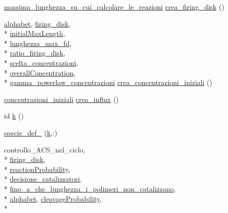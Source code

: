 \begin{DoxyCompactItemize}
\hyperlink{a00065_a4e714d8e6551275aafab501b8c9f18ad}{massima\-\_\-lunghezza\-\_\-su\-\_\-cui\-\_\-calcolare\-\_\-le\-\_\-reazioni} \hyperlink{a00062_a9436783422a447fac5122c24d195e61d}{crea\-\_\-firing\-\_\-disk} ()
\item 
\hyperlink{a00065_abcbc32fc68e4323620d6171a17310212}{alphabet}, \hyperlink{a00055_acb72987b5000cf59c6f81c482e2ac8ac}{firing\-\_\-disk}, \\*
\hyperlink{a00064_a4c7433c24b6426a15069cc5a93a5cbec}{initial\-Max\-Length}, \\*
\hyperlink{a00065_a7c974cc56015b6503e0619d32ebd4180}{lunghezza\-\_\-max\-\_\-fd}, \\*
\hyperlink{a00064_acd685f63a27f53fc049aff633634ddd6}{ratio\-\_\-firing\-\_\-disk}, \\*
\hyperlink{a00065_ac60b74a4c1b8bc23e64008ba1e0c41a8}{scelta\-\_\-concentrazioni}, \\*
\hyperlink{a00065_a59597688ed79473c0234f45eb9167574}{overall\-Concentration}, \\*
\hyperlink{a00065_a7cd0915d7542523abc226a8eecf67ecf}{gamma\-\_\-powerlaw\-\_\-concentrazioni} \hyperlink{a00062_a46820e2abe661887eb3c03ebcdd5aa14}{crea\-\_\-concentrazioni\-\_\-iniziali} ()
\item 
\hyperlink{a00055_a89801fa89eee3ba40f6610f290d6f6c3}{concentrazioni\-\_\-iniziali} \hyperlink{a00062_aedefd8a9b5b6248834cd58472da4be7d}{crea\-\_\-influx} ()
\item 
id \hyperlink{a00062_abf70355c2e58f64c6b18bda1b9bccfd7}{k} ()
\item 
\hyperlink{a00062_a206c02e53d19e1a7f6c297114dd5becb}{specie\-\_\-def\-\_} (\hyperlink{a00062_abf70355c2e58f64c6b18bda1b9bccfd7}{k},\-:)
\item 
controllo\-\_\-\-A\-C\-S\-\_\-nel\-\_\-ciclo, \\*
\hyperlink{a00055_acb72987b5000cf59c6f81c482e2ac8ac}{firing\-\_\-disk}, \\*
\hyperlink{a00065_a9101beaeb03fddb5c6a9e68442177543}{reaction\-Probability}, \\*
\hyperlink{a00065_a78948f867453293fcff0835b1bb05b8c}{decisione\-\_\-catalizzatori}, \\*
\hyperlink{a00065_ab6966d9ee620bc7376dc41a38352b948}{fino\-\_\-a\-\_\-che\-\_\-lunghezza\-\_\-i\-\_\-polimeri\-\_\-non\-\_\-catalizzano}, \\*
\hyperlink{a00065_abcbc32fc68e4323620d6171a17310212}{alphabet}, \hyperlink{a00065_a9d512df05ee559766d2b8f08e4704b04}{cleavage\-Probability}, \\*

\end{DoxyCompactItemize}
